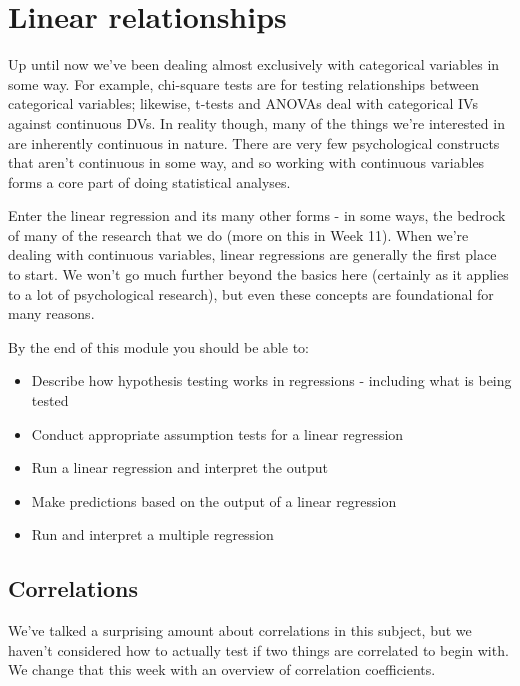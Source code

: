 \documentclass[
]{book}
\providecommand{\tightlist}{%
  \setlength{\itemsep}{0pt}\setlength{\parskip}{0pt}}
\begin{document}
\hypertarget{linear-relationships}{%
\chapter{Linear relationships}\label{linear-relationships}}

Up until now we've been dealing almost exclusively with categorical variables in some way. For example, chi-square tests are for testing relationships between categorical variables; likewise, t-tests and ANOVAs deal with categorical IVs against continuous DVs. In reality though, many of the things we're interested in are inherently continuous in nature. There are very few psychological constructs that aren't continuous in some way, and so working with continuous variables forms a core part of doing statistical analyses.

Enter the linear regression and its many other forms - in some ways, the bedrock of many of the research that we do (more on this in Week 11). When we're dealing with continuous variables, linear regressions are generally the first place to start. We won't go much further beyond the basics here (certainly as it applies to a lot of psychological research), but even these concepts are foundational for many reasons.

By the end of this module you should be able to:

\begin{itemize}
\tightlist
\item
  Describe how hypothesis testing works in regressions - including what is being tested
\item
  Conduct appropriate assumption tests for a linear regression
\item
  Run a linear regression and interpret the output
\item
  Make predictions based on the output of a linear regression
\item
  Run and interpret a multiple regression
\end{itemize}

\hypertarget{correlations}{%
\section{Correlations}\label{correlations}}

We've talked a surprising amount about correlations in this subject, but we haven't considered how to actually test if two things are correlated to begin with. We change that this week with an overview of correlation coefficients.
\end{document}

